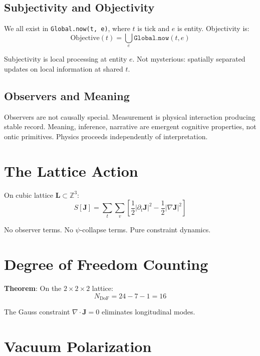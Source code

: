\documentclass[aps,prl,twocolumn,showpacs,superscriptaddress,groupedaddress]{revtex4-2}
\begin{document}
\subsection{Subjectivity and Objectivity}

We all exist in \texttt{Global.now(t, e)}, where $t$ is tick and $e$ is entity. Objectivity is:
\begin{equation}
\text{Objective}(t) = \bigcup_{e} \texttt{Global.now}(t, e)
\end{equation}

Subjectivity is local processing at entity $e$. Not mysterious: spatially separated updates on local information at shared $t$.

\subsection{Observers and Meaning}

Observers are not causally special. Measurement is physical interaction producing stable record. Meaning, inference, narrative are emergent cognitive properties, not ontic primitives. Physics proceeds independently of interpretation.

\section{The Lattice Action}

On cubic lattice $\mathbf{L} \subset \mathbb{Z}^3$:
\begin{equation}
S[\mathbf{J}] = \sum_t \sum_v \left[ \frac{1}{2}|\partial_t \mathbf{J}|^2 - \frac{1}{2}|\nabla \mathbf{J}|^2 \right]
\end{equation}

No observer terms. No $\psi$-collapse terms. Pure constraint dynamics.

\section{Degree of Freedom Counting}

\textbf{Theorem}: On the $2 \times 2 \times 2$ lattice:
\begin{equation}
N_{\text{DoF}} = 24 - 7 - 1 = 16
\end{equation}

The Gauss constraint $\nabla \cdot \mathbf{J} = 0$ eliminates longitudinal modes.

\section{Vacuum Polarization}
\end{document}
